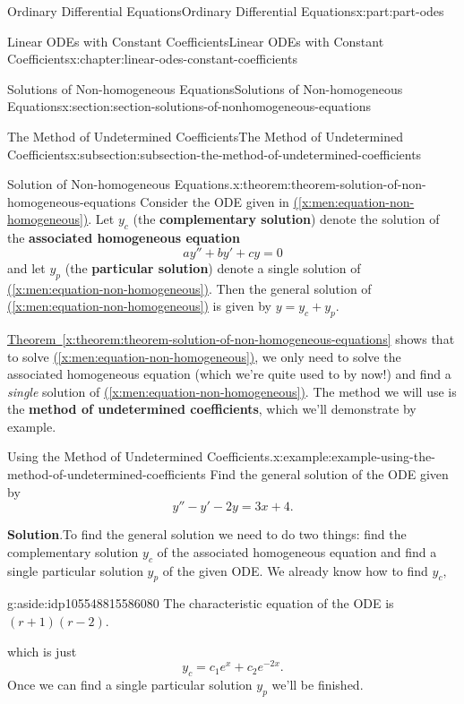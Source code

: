 \documentclass[twoside,10pt,]{book}
\newcommand{\blocktitlefont}{\relax}
\newcommand{\xreffont}{\relax}
\newcommand{\terminology}[1]{\textbf{#1}}
\numberwithin{equation}{part}
\begin{document}
\begin{partptx}{Ordinary Differential Equations}{}{Ordinary Differential Equations}{}{}{x:part:part-odes}
\begin{chapterptx}{Linear ODEs with Constant Coefficients}{}{Linear ODEs with Constant Coefficients}{}{}{x:chapter:linear-odes-constant-coefficients}
\begin{sectionptx}{Solutions of Non-homogeneous Equations}{}{Solutions of Non-homogeneous Equations}{}{}{x:section:section-solutions-of-nonhomogeneous-equations}
\begin{subsectionptx}{The Method of Undetermined Coefficients}{}{The Method of Undetermined Coefficients}{}{}{x:subsection:subsection-the-method-of-undetermined-coefficients}
\begin{theorem}{Solution of Non-homogeneous Equations.}{}{x:theorem:theorem-solution-of-non-homogeneous-equations}
Consider the ODE given in \hyperref[x:men:equation-non-homogeneous]{({\xreffont\ref{x:men:equation-non-homogeneous}})}. Let \(y_{c}\) (the \terminology{complementary solution}) denote the solution of the \terminology{associated homogeneous equation}%
\begin{equation*}
ay'' + by' + cy = 0
\end{equation*}
and let \(y_{p}\) (the \terminology{particular solution}) denote a single solution of \hyperref[x:men:equation-non-homogeneous]{({\xreffont\ref{x:men:equation-non-homogeneous}})}. Then the general solution of \hyperref[x:men:equation-non-homogeneous]{({\xreffont\ref{x:men:equation-non-homogeneous}})} is given by \(y = y_{c} + y_{p}\).%
\end{theorem}
\hyperref[x:theorem:theorem-solution-of-non-homogeneous-equations]{Theorem~{\xreffont\ref{x:theorem:theorem-solution-of-non-homogeneous-equations}}} shows that to solve \hyperref[x:men:equation-non-homogeneous]{({\xreffont\ref{x:men:equation-non-homogeneous}})}, we only need to solve the associated homogeneous equation (which we're quite used to by now!) and find a \emph{single} solution of \hyperref[x:men:equation-non-homogeneous]{({\xreffont\ref{x:men:equation-non-homogeneous}})}. The method we will use is the \terminology{method of undetermined coefficients}, which we'll demonstrate by example.%
\begin{example}{Using the Method of Undetermined Coefficients.}{x:example:example-using-the-method-of-undetermined-coefficients}%
Find the general solution of the ODE given by%
\begin{equation*}
y'' - y' - 2y = 3x + 4.
\end{equation*}
%
\par\smallskip%
\noindent\textbf{\blocktitlefont Solution}.\hypertarget{g:solution:idp105548815617952}{}\quad{}To find the general solution we need to do two things: find the complementary solution \(y_{c}\) of the associated homogeneous equation and find a single particular solution \(y_{p}\) of the given ODE. We already know how to find \(y_{c},\)\begin{aside}{}{g:aside:idp105548815586080}%
The characteristic equation of the ODE is \((r + 1)(r - 2)\).%
\end{aside}
 which is just%
\begin{equation*}
y_{c} = c_{1}e^{x} + c_{2}e^{-2x}.
\end{equation*}
Once we can find a single particular solution \(y_{p}\) we'll be finished.%

\end{example}
\end{subsectionptx}
\end{sectionptx}
\end{chapterptx}
\end{partptx}
\end{document}

